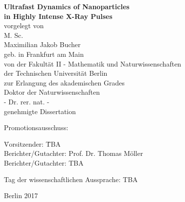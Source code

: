 %
\begin{fullsizetitle}
\vspace{40mm}
\begin{center}
%
{\LARGE \textbf{Ultrafast Dynamics of Nanoparticles\\in Highly Intense X-Ray Pulses\vspace{20mm}\\}}%
{\large%
vorgelegt von
\vspace{4mm}\\
M. Sc.}%
\vspace{2mm}\\
%
{\Large Maximilian Jakob Bucher}
\vspace{4mm}\\
%
{\large geb. in Frankfurt am Main} %
\vspace{20mm}
\\
%
{\large %
von der Fakult\"{a}t II - Mathematik und Naturwissenschaften
\vspace{1mm}\\
der Technischen Universit\"{a}t Berlin
\vspace{1mm}\\
zur Erlangung des akademischen Grades
%
\vspace{5mm}
\\
%
Doktor der Naturwissenschaften
\vspace{1mm}\\
- Dr. rer. nat. -
%
\vspace{10mm}
\\
%
%
genehmigte Dissertation
\vspace{10mm}}
\\
\end{center}
%
{\large%
\hspace{22mm}Promotionsausschuss:
%
%
\begin{tabbing}
%
\hspace{22mm}\= Vorsitzender:\hspace{20mm} \= TBA\\%
\>Berichter/Gutachter: \> Prof. Dr. Thomas M\"{o}ller \\
\>Berichter/Gutachter: \> TBA%
%
\end{tabbing}
%
\leavevmode
\hspace{22mm}Tag der wissenschaftlichen Aussprache: TBA%
}
%
\begin{center}
%
\vspace{20mm}
%
{\large %
Berlin 2017}
%
\end{center}
%
\end{fullsizetitle}
%
%